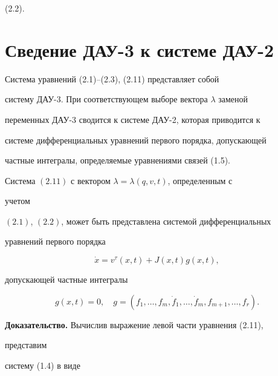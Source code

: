 (2.2). 


 


\section{Сведение ДАУ-3 к системе ДАУ-2} 


 


Система уравнений (2.1)--(2.3), (2.11) представляет собой 


систему ДАУ-3. При соответствующем выборе вектора $\lambda$ заменой 


переменных ДАУ-3 сводится к системе ДАУ-2, которая приводится к 


системе дифференциальных уравнений первого порядка, допускающей 


частные интегралы, определяемые уравнениями связей (1.5). 


 


\begin{thm} 


Система $(2.11)$ с вектором $\lambda=\lambda(q,v,t)$, определенным с 


учетом 


$(2.1)$, $(2.2)$, может быть представлена системой дифференциальных 


уравнений первого порядка 


\begin{equation} 


\Dot x=v^\tau(x,t)+J(x,t)g(x,t), 


\end{equation} 


допускающей частные интегралы 


\begin{equation} 


g(x,t)=0,\quad g=(f_1,\dotsc,f_m,\Dot f_1,\dotsc, 


\Dot f_m,f_{m+1},\dotsc,f_r). 


\end{equation} 


\end{thm} 


 


{\bf Доказательство.} Вычислив выражение левой части уравнения (2.11), 


представим 


систему (1.4) в виде 


